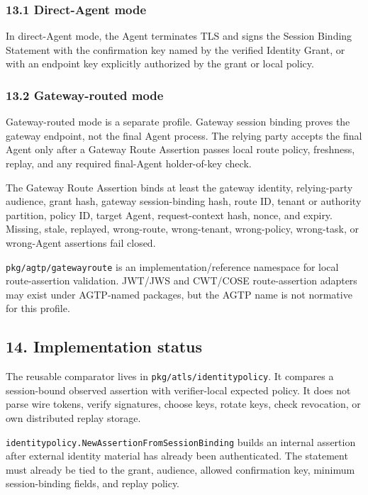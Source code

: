 \documentclass[
]{article}
\begin{document}
\subsubsection{13.1 Direct-Agent mode}\label{direct-agent-mode}

In direct-Agent mode, the Agent terminates TLS and signs the Session
Binding Statement with the confirmation key named by the verified
Identity Grant, or with an endpoint key explicitly authorized by the
grant or local policy.

\subsubsection{13.2 Gateway-routed mode}\label{gateway-routed-mode}

Gateway-routed mode is a separate profile. Gateway session binding
proves the gateway endpoint, not the final Agent process. The relying
party accepts the final Agent only after a Gateway Route Assertion
passes local route policy, freshness, replay, and any required
final-Agent holder-of-key check.

The Gateway Route Assertion binds at least the gateway identity,
relying-party audience, grant hash, gateway session-binding hash, route
ID, tenant or authority partition, policy ID, target Agent,
request-context hash, nonce, and expiry. Missing, stale, replayed,
wrong-route, wrong-tenant, wrong-policy, wrong-task, or wrong-Agent
assertions fail closed.

\texttt{pkg/agtp/gatewayroute} is an implementation/reference namespace
for local route-assertion validation. JWT/JWS and CWT/COSE
route-assertion adapters may exist under AGTP-named packages, but the
AGTP name is not normative for this profile.

\subsection{14. Implementation status}\label{implementation-status}

The reusable comparator lives in \texttt{pkg/atls/identitypolicy}. It
compares a session-bound observed assertion with verifier-local expected
policy. It does not parse wire tokens, verify signatures, choose keys,
rotate keys, check revocation, or own distributed replay storage.

\texttt{identitypolicy.NewAssertionFromSessionBinding} builds an
internal assertion after external identity material has already been
authenticated. The statement must already be tied to the grant,
audience, allowed confirmation key, minimum session-binding fields, and
replay policy.
\end{document}
